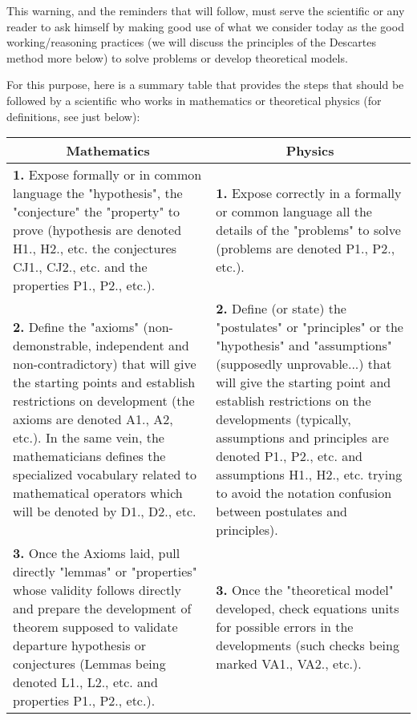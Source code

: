 	This warning, and the reminders that will follow, must serve the scientific or any reader to ask himself by making good use of what we consider today as the good working/reasoning practices (we will discuss the principles of the Descartes method more below) to solve problems or develop theoretical models.

\pagebreak
For this purpose, here is a summary table that provides the steps that should be followed by a scientific who works in mathematics or theoretical physics (for definitions, see just below):

	\begin{table}[H]
	\begin{center}
			\begin{tabular}{|p{7.5cm}|p{7.5cm}|}
				\hline
				\multicolumn{1}{c}{\cellcolor{black!30}\textbf{Mathematics}} & 
  \multicolumn{1}{c}{\cellcolor{black!30}\textbf{Physics}} \\ \hline
				\textbf{1.} Expose formally or in common language the "hypothesis", the "conjecture" the "property" to prove (hypothesis are denoted H1., H2., etc. the conjectures CJ1., CJ2., etc. and the properties P1., P2., etc.). & \textbf{1.} Expose correctly in a formally or common language all the details of the "problems" to solve (problems are denoted P1., P2., etc.). \\ \hline
				\textbf{2.} Define the "axioms" (non-demonstrable, independent and non-contradictory) that will give the starting points and establish restrictions on development (the axioms are denoted A1., A2, etc.)\footnotemark. \newline\newline
In the same vein, the mathematicians defines the specialized vocabulary related to mathematical operators which will be denoted by D1., D2., etc. & \textbf{2.} Define (or state) the "postulates" or "principles" or the "hypothesis" and "assumptions" (supposedly unprovable...) that will give the starting point and establish restrictions on the developments (typically, assumptions and principles are denoted P1., P2., etc. and assumptions H1., H2., etc. trying to avoid the notation confusion between postulates and principles)\footnotemark. \\ \hline
				\textbf{3.} Once the Axioms laid, pull directly "lemmas" or "properties" whose validity follows directly and prepare the development of theorem supposed to validate departure hypothesis or conjectures (Lemmas being denoted L1., L2., etc. and properties P1., P2., etc.). & \textbf{3.} Once the "theoretical model" developed, check equations units for possible errors in the developments (such checks being marked VA1., VA2., etc.).\\ \hline

\end{tabular}
\end{center}
\end{table}
